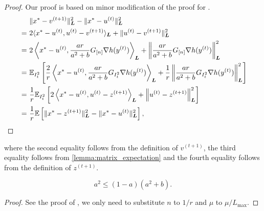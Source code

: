 \begin{proof}
    Our proof is based on minor modification of the proof for \citealp[Lemma~A.2]{Lu18}.
    \begin{align*}
         &\| x^* - v^{(t+1)} \|^2_{\boldsymbol{L}} - \| x^* - u^{(t)} \|^2_{\boldsymbol{L}}  \\
         ~=~& 2 \langle x^* - u^{(t)}, u^{(t)} - v^{(t+1)} \rangle_{\boldsymbol{L}} + \| u^{(t)} - v^{(t+1)} \|_{\boldsymbol{L}}^2 \\
         ~=~& 2 \left\langle x^* - u^{(t)}, \frac{ar}{a^2 + b} G_{[n]} \nabla h(y^{(t)}) \right\rangle_{\boldsymbol{L}} + \left\| \frac{ar}{a^2 + b} G_{[n]} \nabla h(y^{(t)}) \right\|_{\boldsymbol{L}}^2  \\
       ~=~& \mathbb{E}_{I_t^2}\left[ \frac{2}{r} \left\langle x^* - u^{(t)}, \frac{ar}{a^2 + b} G_{I_t^2} \nabla h(y^{(t)}) \right\rangle_{\boldsymbol{L} } + \frac{1}{r} \left\| \frac{ar}{a^2 + b} G_{I_t^2} \nabla h(y^{(t)}) \right\|_{\boldsymbol{L}}^2 \right]  \\
       ~=~& \frac{1}{r} \mathbb{E}_{I_t^2}\left[ 2 \left\langle x^* - u^{(t)}, u^{(t)} - z^{(t+1)} \right\rangle_{\boldsymbol{L} } + \left\| u^{(t)} - z^{(t+1)} \right\|_{\boldsymbol{L}}^2 \right]  \\
       ~=~& \frac{1}{r}  \mathbb{E} \left[ \| x^* - z^{(t+1)} \|^2_{\boldsymbol{L}} - \| x^* - u^{(t)} \|^2_{\boldsymbol{L}} \right],
    \end{align*}
\end{proof}
where the second equality follows from the definition of $v^{(t+1)}$, the third equality follows from \autoref{lemma:matrix_expectation} and the fourth equality follows from the definition of $z^{(t+1)}$.

\begin{lemma} \label{lemma:Lu18A3}
    \[
        a^2 \leq (1 - a)(a^2 + b).
    \]
\end{lemma}
\begin{proof}
     See the proof of \citet[Lemma~A.3]{Lu18}, we only need to substitute $n$ to $1/r$ and $\mu$ to $\mu/L_{\max}$.
\end{proof}

